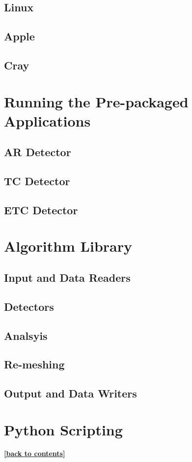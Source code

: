 \documentclass[a4paper,10pt,DIV=12]{scrreprt}
\begin{document}
\subsection{Linux}
\subsection{Apple}
\subsection{Cray}
\section{Running the Pre-packaged Applications}
\subsection{AR Detector}
\subsection{TC Detector}
\subsection{ETC Detector}
\section{Algorithm Library}
\subsection{Input and Data Readers}
\subsection{Detectors}
\subsection{Analsyis}
\subsection{Re-meshing}
\subsection{Output and Data Writers}
\section{Python Scripting}
\hyperlink{toc}{\footnotesize \bf [back to contents]}
\end{document}
